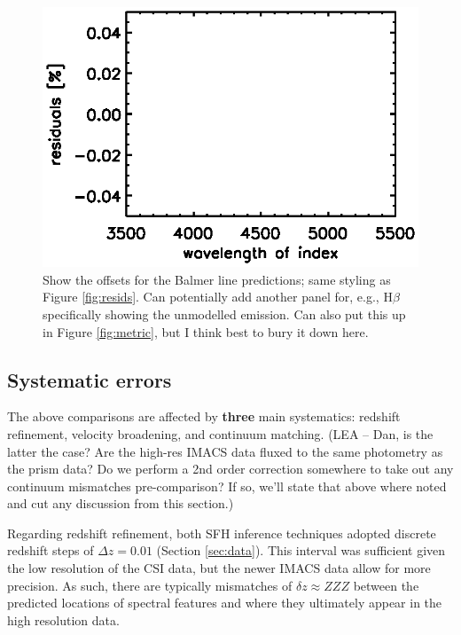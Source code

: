 \documentclass[a4paper,fleqn,usenatbib]{mnras}
\newcommand{\bfr}{\bf\color{red}}
\newcommand{\bfb}{\color{myblue}}
\begin{document}
\begin{figure}
\centering
\includegraphics[scale = 0.9, trim = 1cm 0cm 0cm 0cm]{balmer}
\caption{\bfb Show the offsets for the Balmer line predictions; same styling as Figure \ref{fig:resids}.
		Can potentially add another panel for, e.g., H$\beta$ specifically showing the unmodelled 
		emission. Can also put this up in Figure \ref{fig:metric}, but I think best to bury it down here.}
\label{fig:balmer}
\end{figure}

\subsection{Systematic errors}
\label{sec:systematics}

The above comparisons are affected by {\bfr three} main systematics: redshift refinement, 
velocity broadening,
and continuum matching. {\bfb (LEA -- Dan, is the latter the case? Are the high-res IMACS data fluxed
to the same photometry as the prism data? Do we perform a 2nd order correction somewhere to take
out any continuum mismatches pre-comparison? If so, we'll state that above where noted and cut any
discussion from this section.)}

Regarding redshift refinement, both SFH inference techniques 
adopted discrete redshift steps of {\bfr $\Delta z = 0.01$} (Section \ref{sec:data}). 
This interval was sufficient
given the low resolution of the CSI data, but the newer IMACS data allow for
more precision. As such, there are typically mismatches of 
{\bfr $\delta z \approx ZZZ$} between the predicted locations of spectral features and where they 
ultimately appear in the high resolution data.
\end{document}
